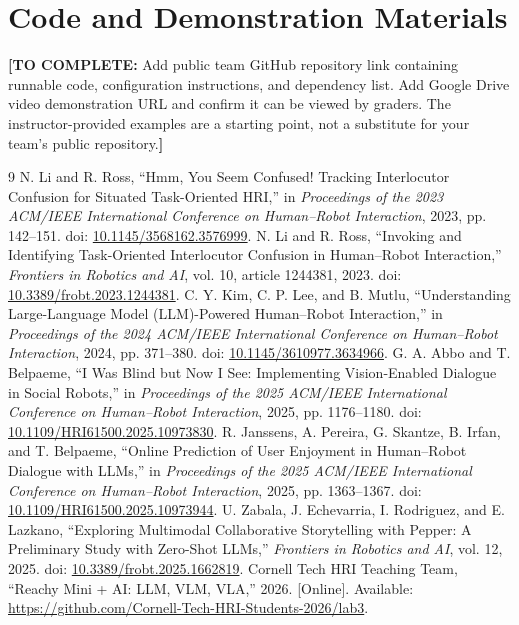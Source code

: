 \documentclass[conference]{IEEEtran}
\newcommand{\drafttodo}[1]{\par\smallskip\noindent\textcolor{red!65!black}{\textbf{[TO COMPLETE:} #1\textbf{]}}\par\smallskip}
\begin{document}
\section*{Code and Demonstration Materials}
\drafttodo{Add public team GitHub repository link containing runnable code, configuration instructions, and dependency list. Add Google Drive video demonstration URL and confirm it can be viewed by graders. The instructor-provided examples are a starting point, not a substitute for your team's public repository.}

\begin{thebibliography}{9}
 N. Li and R. Ross, ``Hmm, You Seem Confused! Tracking Interlocutor Confusion for Situated Task-Oriented HRI,'' in \emph{Proceedings of the 2023 ACM/IEEE International Conference on Human--Robot Interaction}, 2023, pp. 142--151. doi: \href{https://doi.org/10.1145/3568162.3576999}{10.1145/3568162.3576999}.
 N. Li and R. Ross, ``Invoking and Identifying Task-Oriented Interlocutor Confusion in Human--Robot Interaction,'' \emph{Frontiers in Robotics and AI}, vol. 10, article 1244381, 2023. doi: \href{https://doi.org/10.3389/frobt.2023.1244381}{10.3389/frobt.2023.1244381}.
 C. Y. Kim, C. P. Lee, and B. Mutlu, ``Understanding Large-Language Model (LLM)-Powered Human--Robot Interaction,'' in \emph{Proceedings of the 2024 ACM/IEEE International Conference on Human--Robot Interaction}, 2024, pp. 371--380. doi: \href{https://doi.org/10.1145/3610977.3634966}{10.1145/3610977.3634966}.
 G. A. Abbo and T. Belpaeme, ``I Was Blind but Now I See: Implementing Vision-Enabled Dialogue in Social Robots,'' in \emph{Proceedings of the 2025 ACM/IEEE International Conference on Human--Robot Interaction}, 2025, pp. 1176--1180. doi: \href{https://doi.org/10.1109/HRI61500.2025.10973830}{10.1109/HRI61500.2025.10973830}.
 R. Janssens, A. Pereira, G. Skantze, B. Irfan, and T. Belpaeme, ``Online Prediction of User Enjoyment in Human--Robot Dialogue with LLMs,'' in \emph{Proceedings of the 2025 ACM/IEEE International Conference on Human--Robot Interaction}, 2025, pp. 1363--1367. doi: \href{https://doi.org/10.1109/HRI61500.2025.10973944}{10.1109/HRI61500.2025.10973944}.
 U. Zabala, J. Echevarria, I. Rodriguez, and E. Lazkano, ``Exploring Multimodal Collaborative Storytelling with Pepper: A Preliminary Study with Zero-Shot LLMs,'' \emph{Frontiers in Robotics and AI}, vol. 12, 2025. doi: \href{https://doi.org/10.3389/frobt.2025.1662819}{10.3389/frobt.2025.1662819}.
 Cornell Tech HRI Teaching Team, ``Reachy Mini + AI: LLM, VLM, VLA,'' 2026. [Online]. Available: \url{https://github.com/Cornell-Tech-HRI-Students-2026/lab3}.
\end{thebibliography}
\end{document}
